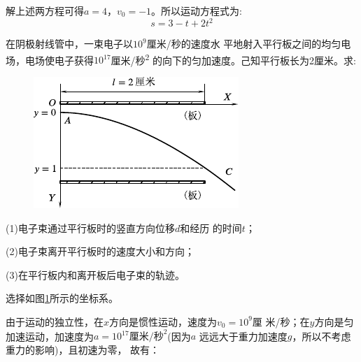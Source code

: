 解上述两方程可得$a=4$，$v_0=-1$。所以运动方程式为:
\begin{equation*}
  s=3-t+2t^2
\end{equation*}

\example 在阴极射线管中，一束电子以$10^9$厘米/秒的速度水
平地射入平行板之间的均匀电场，电场使电子获得$10^{17}$厘米/秒\textsuperscript{2}
的向下的匀加速度。己知平行板长为2厘米。求:

\begin{figure}
  \centering
  \includegraphics{figure/fig01.15}
  \caption{}
  \label{fig:01.15}
\end{figure}
(1)电子束通过平行板时的竖直方向位移$d$和经历
的时间$t$；

(2)电子束离开平行板时的速度大小和方向；

(3)在平行板内和离开板后电子束的轨迹。

\solution 选择如图\ref{fig:01.15}所示的坐标系。

由于运动的独立性，在$x$方向是惯性运动，速度为$v_0=10^9$厘
米/秒；在$y$方向是匀加速运动，加速度为$a=10^{17}\text{厘米/秒}^2$(因为$a$
远远大于重力加速度$g$，所以不考虑重力的影响)，且初速为零，
故有：

